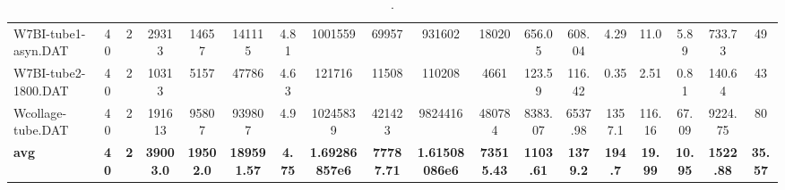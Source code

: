 \begin{sidewaystable}[h]
{\begin{tabular}{lccccccccccccccccc}
W7BI-tube1-asyn.DAT & 40 & 2 & 29313 & 14657 & 141115 & 4.81 & 1001559 & 69957 & 931602 & 18020 & 656.05 & 608.04 & 4.29 & 11.0 & 5.89 & 733.73 & 49\\
W7BI-tube2-1800.DAT & 40 & 2 & 10313 & 5157 & 47786 & 4.63 & 121716 & 11508 & 110208 & 4661 & 123.59 & 116.42 & 0.35 & 2.51 & 0.81 & 140.64 & 43\\
Wcollage-tube.DAT & 40 & 2 & 191613 & 95807 & 939807 & 4.9 & 10245839 & 421423 & 9824416 & 480784 & 8383.07 & 6537.98 & 1357.1 & 116.16 & 67.09 & 9224.75 & 80\\
\cline{1-18} \textbf{avg} & \textbf{40} & \textbf{2} & \textbf{39003.0} & \textbf{19502.0} & \textbf{189591.57} & \textbf{4.75} & \textbf{1.69286857e6} & \textbf{77787.71} & \textbf{1.61508086e6} & \textbf{73515.43} & \textbf{1103.61} & \textbf{1379.2} & \textbf{194.7} & \textbf{19.99} & \textbf{10.95} & \textbf{1522.88} & \textbf{35.57} \\ \cline{1-18}
\bottomrule
\end{tabular}%
}%
\caption{.}
\label{tab:table_bc}
\end{sidewaystable}

